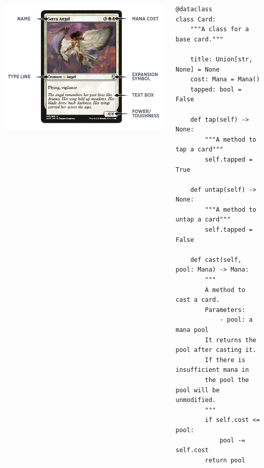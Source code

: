 \documentclass{beamer}
\begin{document}
    \begin{frame}[fragile]
        \begin{columns}
            \begin{column}{.5\textwidth}
                \begin{center}
                    \includegraphics[height=.8\textwidth]{./img/serra_angel/main.png}
                \end{center}
            \end{column}
            \tiny
            \begin{column}{.5\textwidth}
                \begin{verbatim}
@dataclass
class Card:
    """A class for a base card."""

    title: Union[str, None] = None
    cost: Mana = Mana()
    tapped: bool = False

    def tap(self) -> None:
        """A method to tap a card"""
        self.tapped = True

    def untap(self) -> None:
        """A method to untap a card"""
        self.tapped = False

    def cast(self, pool: Mana) -> Mana:
        """
        A method to cast a card.
        Parameters:
            - pool: a mana pool
        It returns the pool after casting it.
        If there is insufficient mana in
        the pool the pool will be unmodified.
        """
        if self.cost <= pool:
            pool -= self.cost
        return pool
                \end{verbatim}
            \end{column}
        \end{columns}
    \end{frame}
\end{document}
